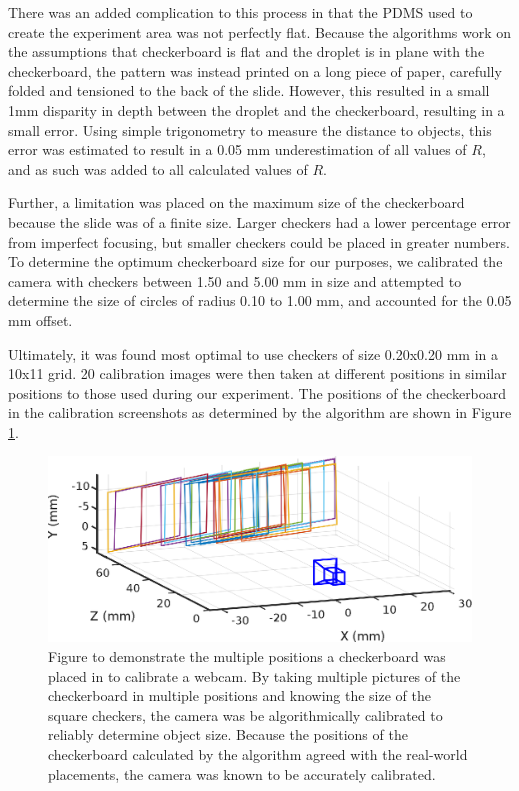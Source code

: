 \documentclass{physics_article_B}
\begin{document}
            There was an added complication to this process in that the PDMS used to create the experiment area was not perfectly flat. Because the algorithms work on the assumptions that checkerboard is flat and the droplet is in plane with the checkerboard, the pattern was instead printed on a long piece of paper, carefully folded and tensioned to the back of the slide. However, this resulted in a small 1mm disparity in depth between the droplet and the checkerboard, resulting in a small error. Using simple trigonometry to measure the distance to objects, this error was estimated to result in a 0.05 mm underestimation of all values of $R$, and as such was added to all calculated values of $R$. 
            
            Further, a limitation was placed on the maximum size of the checkerboard because the slide was of a finite size. Larger checkers had a lower percentage error from imperfect focusing, but smaller checkers could be placed in greater numbers. To determine the optimum checkerboard size for our purposes, we calibrated the camera with checkers between 1.50 and 5.00 mm in size and attempted to determine the size of circles of radius 0.10 to 1.00 mm, and accounted for the 0.05 mm offset. 
            
            Ultimately, it was found most optimal to use checkers of size 0.20x0.20 mm in a 10x11 grid. 20 calibration images were then taken at different positions in similar positions to those used during our experiment. The positions of the checkerboard in the calibration screenshots as determined by the algorithm are shown in Figure \ref{fig:calib}. 
            
                \begin{figure}[H]
                    \centering\includegraphics[scale=0.86]{Figures/CameraExtrinsics.eps}
                    \caption{Figure to demonstrate the multiple positions a checkerboard was placed in to calibrate a webcam. By taking multiple pictures of the checkerboard in multiple positions and knowing the size of the square checkers, the camera was be algorithmically calibrated to reliably determine object size. Because the positions of the checkerboard calculated by the algorithm agreed with the real-world placements, the camera was known to be accurately calibrated.}\label{fig:calib}
                \end{figure}
            
\end{document}
